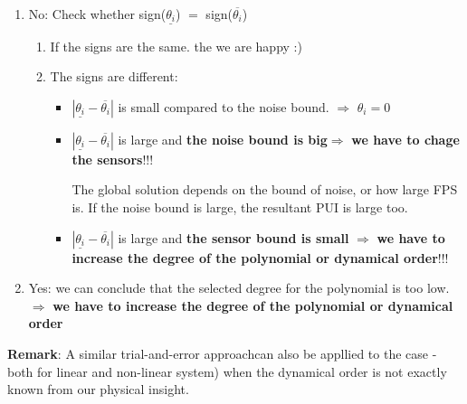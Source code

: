  \begin{enumerate}
    \item No: Check whether sign($\underline{\theta_i}$) $=$ sign($\overline{\theta_i}$)    \begin{enumerate}
                              \item If the signs are the same. the we are happy :)
                              \item The signs are different:
                                      \begin{itemize}
                                           \item $|\underline{\theta_i}-\overline{\theta_i}|$ is small compared to the noise bound. $\Rightarrow$ $\theta_i = 0$
                                          \item  $|\underline{\theta_i}-\overline{\theta_i}|$ is large and \textbf{the noise bound is big}$\Rightarrow$ \textbf{we have to chage the sensors}!!!
                                          \begin{QandAbox}
                                                The global solution depends on the bound of noise, or how large FPS is. If the noise bound is large, the resultant PUI is large too.
                                          \end{QandAbox}
                                           \item $|\underline{\theta_i}-\overline{\theta_i}|$ is large and \textbf{the sensor bound is small} $\Rightarrow$ \textbf{we have to increase the degree of the polynomial or dynamical order}!!!
                                      \end{itemize}
                              
                         \end{enumerate}
    \item Yes: we can conclude that the selected degree for the polynomial is too low. $\Rightarrow$ \textbf{we have to increase the degree of the polynomial or dynamical order}
 \end{enumerate}
 
 \textbf{Remark}: A similar trial-and-error approachcan also be appllied to the case - both for linear and non-linear system) when the dynamical order is not exactly known from our physical insight.\\
 

